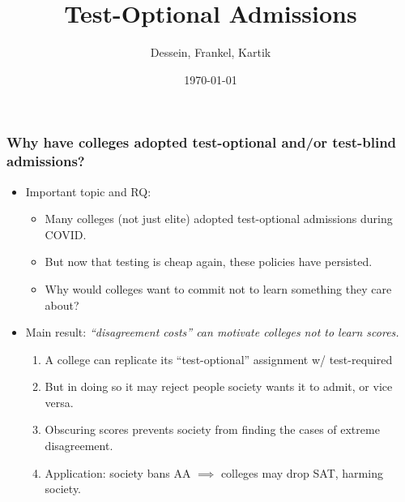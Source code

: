 \documentclass[11pt, aspectratio=169]{beamer}
\theoremstyle{plain}
\theoremstyle{plain}
\theoremstyle{plain}
\theoremstyle{plain}
\begin{document}
\title[]{Test-Optional Admissions}
\author[]{Dessein, Frankel, Kartik}
\date{\today}
\maketitle

\begin{frame}\frametitle{Why have colleges adopted test-optional and/or test-blind admissions?}
    \pause
    \begin{itemize}
        \item Important topic and RQ: \pause
            \begin{itemize}
                \item Many colleges (not just elite) adopted test-optional admissions during COVID. \pause
                \item But now that testing is cheap again, these policies have persisted. \pause
                \item Why would colleges want to commit not to learn something they care about? \pause
            \end{itemize}
        \item Main result: \emph{``disagreement costs'' can motivate colleges not to learn scores.} \pause
        \begin{enumerate}
            \item A college can replicate its ``test-optional'' assignment w/ test-required \pause %
            \item But in doing so it may reject people society wants it to admit, or vice versa. \pause
            \item Obscuring scores prevents society from finding the cases of extreme disagreement. \pause
            \item Application: society bans AA $\implies$ colleges may drop SAT, harming society. \pause
        \end{enumerate}


\end{itemize}
\end{frame}
\end{document}
